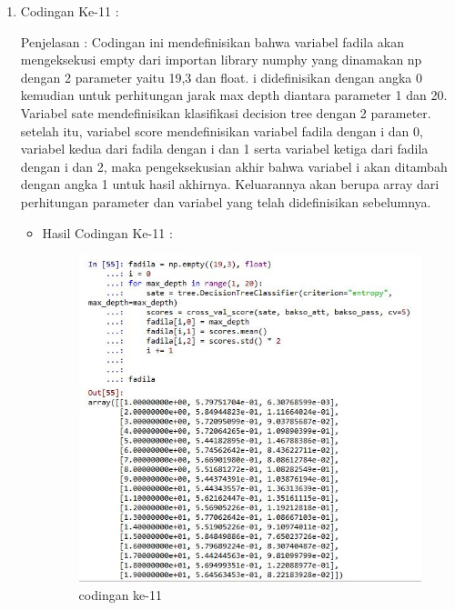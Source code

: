 \begin{enumerate}
\begin{enumerate}
\begin{itemize}
\end{itemize}
\par
\item Codingan Ke-11 :
\par Penjelasan : Codingan ini mendefinisikan bahwa variabel fadila akan mengeksekusi empty dari importan library numphy yang dinamakan np dengan 2 parameter yaitu 19,3 dan float. i didefinisikan dengan angka 0 kemudian untuk perhitungan jarak max depth diantara parameter 1 dan 20. Variabel sate mendefinisikan klasifikasi decision tree dengan 2 parameter. setelah itu, variabel score mendefinisikan variabel fadila dengan i dan 0, variabel kedua dari fadila dengan i dan 1 serta variabel ketiga dari fadila dengan i dan 2, maka pengeksekusian akhir bahwa variabel i akan ditambah dengan angka 1 untuk hasil akhirnya. Keluarannya akan berupa array dari perhitungan parameter dan variabel yang telah didefinisikan sebelumnya.
\par 
\begin{itemize}
\par
\item Hasil Codingan Ke-11 :

\begin{figure}[ht]
\centering
\includegraphics[scale=0.3]{figures/hasil11y.jpg}
\caption{codingan ke-11}
\label{contoh}
\end{figure}


\end{itemize}
\end{enumerate}
\end{enumerate}
